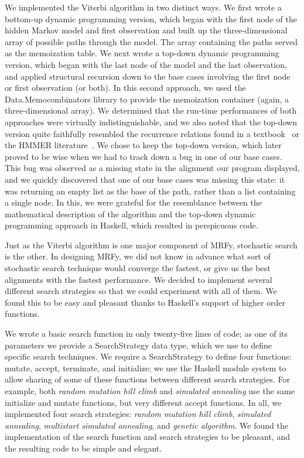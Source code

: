\documentclass[preprint]{sigplanconf}
\begin{document}
We implemented the Viterbi algorithm in two distinct ways. We first wrote a 
bottom-up dynamic programming version, which began with the first node of the 
hidden Markov model and first observation and built up the three-dimensional 
array of possible paths through the model. The array containing the paths 
served as the memoization table. We next wrote a top-down dynamic programming 
version, which began with the last node of the model and the last observation, 
and applied structural recursion down to the base cases involving the first 
node or first observation (or both). In this second approach, we used the 
Data.Memocombinators library to provide the memoization container (again, a 
three-dimensional array). We determined that the run-time performances of both 
approaches were virtually indistinguishable, and we also noted that the 
top-down version quite faithfully resembled the recurrence relations found in a 
textbook~\cite{durbin} or the HMMER literature~\cite{eddy}. We chose to keep 
the top-down version, which later proved to be wise when we had to track down a 
bug in one of our base cases. This bug was observed as a missing state in the 
alignment our program displayed, and we quickly discovered that one of our base 
cases was missing this state: it was returning an empty list as the base of the 
path, rather than a list containing a single node. In this, we were grateful 
for the resemblance between the mathematical description of the algorithm and 
the top-down dynamic programming approach in Haskell, which resulted in 
perspicuous code.

Just as the Viterbi algorithm is one major component of MRFy, stochastic search 
is the other. In designing MRFy, we did not know in advance what sort of 
stochastic search technique would converge the fastest, or give us the best 
alignments with the fastest performance. We decided to implement several 
different search strategies so that we could experiment with all of them. We 
found this to be easy and pleasant thanks to Haskell's support of higher order 
functions.

We wrote a basic search function in only twenty-five lines of code; as one of 
its parameters we provide a SearchStrategy data type, which we use to define 
specific search techniques. We require a SearchStrategy to define four 
functions: mutate, accept, terminate, and initialize; we use the Haskell module 
system to allow sharing of some of these functions between different search 
strategies. For example, both \textit{random mutation hill climb} and 
\textit{simulated annealing} use the same initialize and mutate functions, but 
very different accept functions. In all, we implemented four search strategies: 
\textit{random mutation hill climb}, \textit{simulated annealing}, 
\textit{multistart simulated annealing}, and \textit{genetic algorithm}. We 
found the implementation of the search function and search strategies to be 
pleasant, and the resulting code to be simple and elegant.
\end{document}
